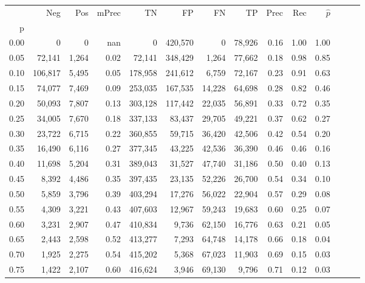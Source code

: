 \begin{tabular}{rrrrrrrrrrrrrr}
\toprule
{} &      Neg &    Pos & mPrec &       TN &       FP &      FN &      TP &  Prec &   Rec & $\hat{p}$ \\
p    &          &        &       &          &          &         &         &       &       &           \\
\midrule
0.00 &        0 &      0 &   nan &        0 &  420,570 &       0 &  78,926 &  0.16 &  1.00 &      1.00 \\
0.05 &   72,141 &  1,264 &  0.02 &   72,141 &  348,429 &   1,264 &  77,662 &  0.18 &  0.98 &      0.85 \\
0.10 &  106,817 &  5,495 &  0.05 &  178,958 &  241,612 &   6,759 &  72,167 &  0.23 &  0.91 &      0.63 \\
0.15 &   74,077 &  7,469 &  0.09 &  253,035 &  167,535 &  14,228 &  64,698 &  0.28 &  0.82 &      0.46 \\
0.20 &   50,093 &  7,807 &  0.13 &  303,128 &  117,442 &  22,035 &  56,891 &  0.33 &  0.72 &      0.35 \\
0.25 &   34,005 &  7,670 &  0.18 &  337,133 &   83,437 &  29,705 &  49,221 &  0.37 &  0.62 &      0.27 \\
0.30 &   23,722 &  6,715 &  0.22 &  360,855 &   59,715 &  36,420 &  42,506 &  0.42 &  0.54 &      0.20 \\
0.35 &   16,490 &  6,116 &  0.27 &  377,345 &   43,225 &  42,536 &  36,390 &  0.46 &  0.46 &      0.16 \\
0.40 &   11,698 &  5,204 &  0.31 &  389,043 &   31,527 &  47,740 &  31,186 &  0.50 &  0.40 &      0.13 \\
0.45 &    8,392 &  4,486 &  0.35 &  397,435 &   23,135 &  52,226 &  26,700 &  0.54 &  0.34 &      0.10 \\
0.50 &    5,859 &  3,796 &  0.39 &  403,294 &   17,276 &  56,022 &  22,904 &  0.57 &  0.29 &      0.08 \\
0.55 &    4,309 &  3,221 &  0.43 &  407,603 &   12,967 &  59,243 &  19,683 &  0.60 &  0.25 &      0.07 \\
0.60 &    3,231 &  2,907 &  0.47 &  410,834 &    9,736 &  62,150 &  16,776 &  0.63 &  0.21 &      0.05 \\
0.65 &    2,443 &  2,598 &  0.52 &  413,277 &    7,293 &  64,748 &  14,178 &  0.66 &  0.18 &      0.04 \\
0.70 &    1,925 &  2,275 &  0.54 &  415,202 &    5,368 &  67,023 &  11,903 &  0.69 &  0.15 &      0.03 \\
0.75 &    1,422 &  2,107 &  0.60 &  416,624 &    3,946 &  69,130 &   9,796 &  0.71 &  0.12 &      0.03 \\

\end{tabular}
